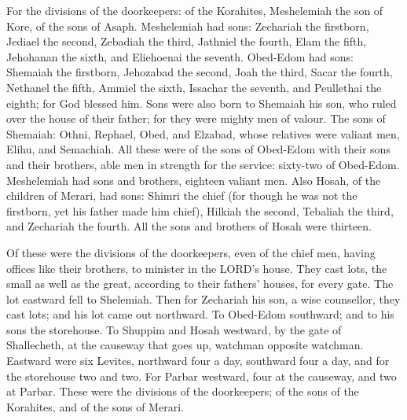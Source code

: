  For the divisions of the doorkeepers: of the Korahites,
Meshelemiah the son of Kore, of the sons of Asaph. 
Meshelemiah had sons: Zechariah the firstborn, Jediael the second,
Zebadiah the third, Jathniel the fourth,  Elam the fifth,
Jehohanan the sixth, and Eliehoenai the seventh.  Obed-Edom
had sons: Shemaiah the firstborn, Jehozabad the second, Joah the third,
Sacar the fourth, Nethanel the fifth,  Ammiel the sixth,
Issachar the seventh, and Peullethai the eighth; for God blessed him.
 Sons were also born to Shemaiah his son, who ruled over the
house of their father; for they were mighty men of valour. 
The sons of Shemaiah: Othni, Rephael, Obed, and Elzabad, whose relatives
were valiant men, Elihu, and Semachiah.  All these were of
the sons of Obed-Edom with their sons and their brothers, able men in
strength for the service: sixty-two of Obed-Edom. 
Meshelemiah had sons and brothers, eighteen valiant men. 
Also Hosah, of the children of Merari, had sons: Shimri the chief (for
though he was not the firstborn, yet his father made him chief),
 Hilkiah the second, Tebaliah the third, and Zechariah the
fourth. All the sons and brothers of Hosah were thirteen.

 Of these were the divisions of the doorkeepers, even of
the chief men, having offices like their brothers, to minister in the
LORD's house.  They cast lots, the small as well as the
great, according to their fathers' houses, for every gate. 
The lot eastward fell to Shelemiah. Then for Zechariah his son, a wise
counsellor, they cast lots; and his lot came out northward.
 To Obed-Edom southward; and to his sons the storehouse.
 To Shuppim and Hosah westward, by the gate of Shallecheth,
at the causeway that goes up, watchman opposite watchman. 
Eastward were six Levites, northward four a day, southward four a day,
and for the storehouse two and two.  For Parbar westward,
four at the causeway, and two at Parbar.  These were the
divisions of the doorkeepers; of the sons of the Korahites, and of the
sons of Merari.

